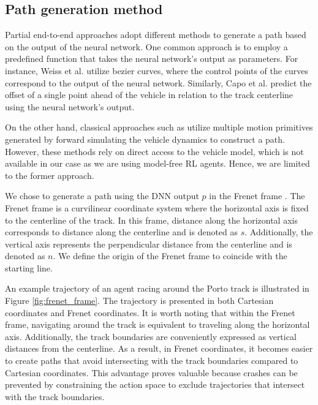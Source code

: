 \subsection{Path generation method}\label{sec:path_construction}

Partial end-to-end approaches adopt different methods to generate a path based on the output of the neural network. 
One common approach is to employ a predefined function that takes the neural network's output as parameters. 
For instance, Weiss et al. \cite{Weiss2020a} utilize bezier curves, where the control points of the curves correspond to the output of the neural network. 
Similarly, Capo et al. \cite{Capo2020} predict the offset of a single point ahead of the vehicle in relation to the track centerline using the neural network's output.

On the other hand, classical approaches such as \cite{keefer2022, Liniger2015a, Wang2021} utilize multiple motion primitives generated by forward simulating the vehicle dynamics to construct a path. 
However, these methods rely on direct access to the vehicle model, which is not available in our case as we are using model-free RL agents.
Hence, we are limited to the former approach.


We chose to generate a path using the DNN output $p$ in the Frenet frame \cite{Stahl2019}.
The Frenet frame is a curvilinear coordinate system where the horizontal axis is fixed to the centerline of the track. 
In this frame, distance along the horizontal axis corresponds to distance along the centerline and is denoted as $s$. 
Additionally, the vertical axis represents the perpendicular distance from the centerline and is denoted as $n$.
We define the origin of the Frenet frame to coincide with the starting line.


An example trajectory of an agent racing around the Porto track is illustrated in Figure \ref{fig:frenet_frame}. 
The trajectory is presented in both Cartesian coordinates and Frenet coordinates. 
It is worth noting that within the Frenet frame, navigating around the track is equivalent to traveling along the horizontal axis. 
Additionally, the track boundaries are conveniently expressed as vertical distances from the centerline. 
As a result, in Frenet coordinates, it becomes easier to create paths that avoid intersecting with the track boundaries compared to Cartesian coordinates. 
This advantage proves valuable because crashes can be prevented by constraining the action space to exclude trajectories that intersect with the track boundaries.

